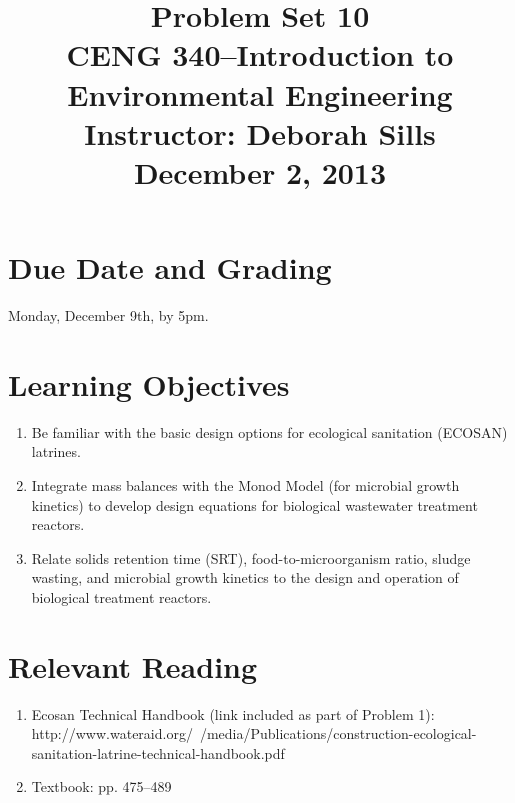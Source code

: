 \documentclass[12pt,letterpaper]{article}
\begin{document}
\setlength{\parindent}{0cm} 


\frenchspacing


\title {\Large{\textbf{Problem Set 10}}\\ \large{CENG 340--Introduction to Environmental Engineering\\
Instructor: Deborah Sills\\ \textbf{December 2, 2013}}}

\author {}
\date {}
\maketitle

\vspace{-1in}
\section *{Due Date and Grading}
Monday, December 9th, by 5pm.\



\section *{Learning Objectives}
\begin{enumerate}
\item Be familiar with the basic design options for ecological sanitation (ECOSAN) latrines.
\item Integrate mass balances with the Monod Model (for microbial growth kinetics) to develop design equations for biological wastewater treatment reactors.
\item Relate solids retention time (SRT), food-to-microorganism ratio, sludge wasting, and microbial growth kinetics to the design and operation of biological treatment reactors.
\end{enumerate}

\section *{Relevant Reading}

\begin{enumerate}
\item Ecosan Technical Handbook (link included as part of Problem 1):\\ http://www.wateraid.org/~/media/Publications/construction-ecological-sanitation-latrine-technical-handbook.pdf

\item Textbook: pp. 475--489
\end{enumerate}
\end{document}
